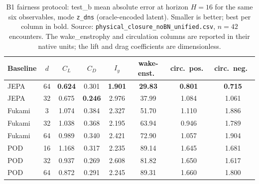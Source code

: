 \begin{table}
  \centering
  \caption{B1 fairness protocol: test\_b mean absolute error at horizon $H = 16$ for
  the same six observables, mode \texttt{z\_dns} (oracle-encoded latent).
  Smaller is better; best per column in bold. Source:
  \texttt{physical\_closure\_noBN\_unified.csv}, $n = 42$ encounters. The wake\_enstrophy
  and circulation columns are reported in their native units; the lift and drag
  coefficients are dimensionless.}
  \label{tab:b1_mae_testb}
  \small
  \begin{tabular}{l c c c c c c c}
    \toprule
    Baseline & $d$ & $C_L$ & $C_D$ & $I_y$ & wake-enst.\ & circ.\ pos.\ & circ.\ neg.\ \\
    \midrule
    JEPA   & 64 & \textbf{0.624} & 0.301 & \textbf{1.901} & \textbf{29.83} & \textbf{0.801} & \textbf{0.715} \\
    JEPA   & 32 & 0.675 & \textbf{0.246} & 2.976 & 37.99 & 1.084 & 1.061 \\
    \midrule
    Fukami & 3  & 1.074 & 0.384 & 2.327 & 51.70 & 1.110 & 1.886 \\
    Fukami & 32 & 1.038 & 0.368 & 2.195 & 63.94 & 0.946 & 1.789 \\
    Fukami & 64 & 0.989 & 0.340 & 2.421 & 72.90 & 1.057 & 1.904 \\
    \midrule
    POD    & 16 & 1.168 & 0.317 & 2.235 & 89.14 & 1.645 & 1.681 \\
    POD    & 32 & 0.937 & 0.269 & 2.608 & 81.82 & 1.650 & 1.617 \\
    POD    & 64 & 0.872 & 0.291 & 2.245 & 89.31 & 1.660 & 1.800 \\
    \bottomrule
  \end{tabular}
\end{table}
